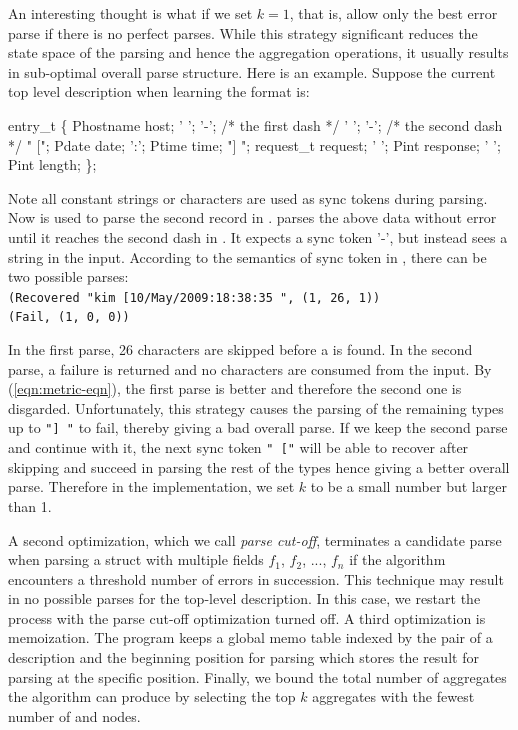An interesting thought is what if
we set $k=1$, that is, allow only the best error parse if there is
no perfect parses. While this strategy significant reduces the
state space of the parsing and hence the aggregation operations,
it usually results in sub-optimal overall parse structure. Here is an
example. Suppose the current top level description  when learning 
the \ai{} format is:
\begin{code}
  entry_t \{
         Phostname      host;
   ' ';  
   '-';  /* the first dash */
   ' ';  
   '-';	 /* the second dash */   
   " ["; Pdate          date;
   ':';  Ptime          time;
   "] "; request_t      request;
   ' ';  Pint           response;
   ' ';  Pint           length;
\};
\end{code}
Note all constant strings or characters are used as sync tokens during
parsing. Now  is used to parse the second record in .
 parses the above data without error until it
reaches the second dash in . It expects a sync token
'-', but instead sees a string  in the input.
According to the semantics of sync token in ,
there can be two possible parses:\\
{\footnotesize
\verb#(Recovered "kim [10/May/2009:18:38:35 ", (1, 26, 1))#\\
\verb#(Fail, (1, 0, 0))#
}

In the first parse, 26 characters are skipped before a \cd{-} is found.
In the second parse, a failure is returned and no characters are consumed
from the input.
By (\ref{eqn:metric-eqn}), the first parse is better and therefore the
second one is disgarded. Unfortunately, this strategy causes the parsing of the
remaining types up to \verb#"] "# to fail, thereby giving a bad overall parse.
If we keep the second parse and continue with it, the next sync token 
\verb#" ["# will be able to recover after skipping  and succeed
in parsing the rest of the types hence giving a better overall parse.
Therefore in the implementation, we set $k$ to be a small number but larger
than 1.

A second optimization, which we call {\em parse cut-off}, terminates a
candidate parse when parsing a struct with multiple
fields $f_1$, $f_2$, ..., $f_n$ if the algorithm encounters 
a threshold number of errors in succession. 
This technique may result in no possible parses for the
top-level description.  In this case, we restart the process
with the parse cut-off optimization turned off. 
A third optimization is memoization.
The program keeps a global memo table indexed by the pair of a
description  and the beginning position for parsing  which
stores the result for parsing  at the specific position.
Finally, we bound the total number of aggregates the
algorithm can produce by selecting the top
$k$ aggregates with the fewest number of  and 
nodes. 


